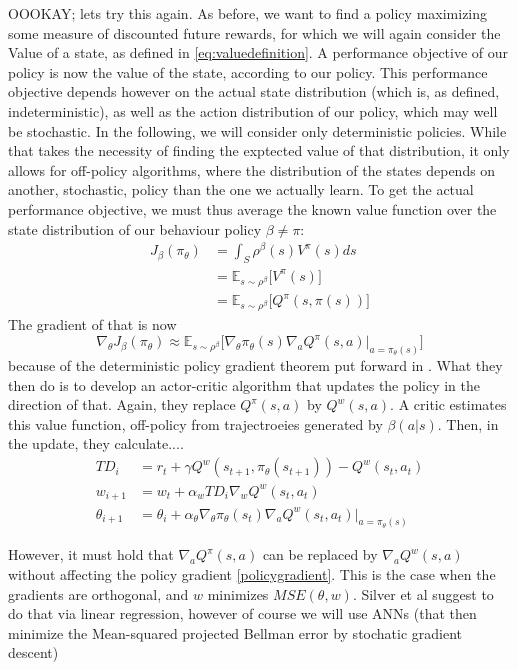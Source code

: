 OOOKAY; lets try this again.
As before, we want to find a policy maximizing some measure of discounted future rewards, for which we will again consider the Value of a state, as defined in \ref{eq:valuedefinition}. A performance objective of our policy is now the value of the state, according to our policy. This performance objective depends however on the actual state distribution (which is, as defined, indeterministic), as well as the action distribution of our policy, which may well be stochastic. In the following, we will consider only deterministic policies. While that takes the necessity of finding the exptected value of that distribution, it only allows for off-policy algorithms, where the distribution of the states depends on another, stochastic, policy than the one we actually learn. To get the actual performance objective, we must thus average the known value function over the state distribution of our behaviour policy $\beta \neq \pi$:
\begin{align}
	J_\beta(\pi_\theta) &= \int_S \rho^\beta(s) V^\pi(s) ds\\
	  &= \mathds{E}_{s\sim\rho^\beta} \big[ V^\pi(s) \big]\\
	  &= \mathds{E}_{s\sim\rho^\beta} \big[ Q^\pi(s,\pi(s)) \big]	
\end{align}
The gradient of that is now 
\begin{equation} \label{policygradient}
	\nabla_{\theta}J_\beta(\pi_\theta) \approx	 \mathds{E}_{s\sim\rho^\beta } \Big[ \nabla_{\theta} \pi_\theta(s) \nabla_a Q^\pi(s,a) \big|_{a=\pi_\theta(s)} \Big]
\end{equation}
because of the deterministic policy gradient theorem put forward in \cite{silver_deterministic_2014}.
What they then do is to develop an actor-critic algorithm that updates the policy in the direction of that. 
Again, they replace $Q^\pi(s,a)$ by $Q^w(s,a)$. A critic estimates this value function, off-policy from trajectroeies generated by $\beta(a|s)$.
Then, in the update, they calculate....
\begin{align}
	TD_i    &= r_t + \gamma Q^w(s_{t+1}, \pi_\theta(s_{t+1})) - Q^w(s_t, a_t)\\
	w_{i+1} &= w_t + \alpha_w TD_i \nabla_w Q^w(s_t, a_t) \\
	\theta_{i+1} &= \theta_i + \alpha_\theta \nabla_\theta \pi_\theta(s_t) \nabla_a Q^w(s_t, a_t) |_{a=\pi_\theta(s)}
\end{align}

However, it must hold that $\nabla_a Q^\pi(s,a)$ can be replaced by $\nabla_a Q^w(s,a)$ without affecting the policy gradient \ref{policygradient}. This is the case when the gradients are orthogonal, and $w$ minimizes $MSE(\theta,w)$. Silver et al \cite{silver_deterministic_2014} suggest to do that via linear regression, however of course we will use ANNs (that then minimize the Mean-squared projected Bellman error by stochatic gradient descent)

